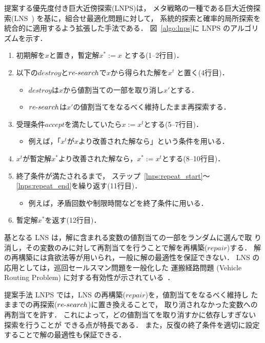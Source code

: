 提案する優先度付き巨大近傍探索(LNPS)は，
メタ戦略の一種である巨大近傍探索(LNS~\cite{Pisinger10})
を基に，組合せ最適化問題に対して，
系統的探索と確率的局所探索を統合的に適用するよう拡張した手法である．
%
図~\ref{algo:lnps}に LNPS のアルゴリズムを示す．
\begin{enumerate}\compress
\item 初期解を$x$と置き，暫定解$x^{*} := x$ とする(1--2行目)．
\item \label{lnps:repeat_start}
  以下の$destroy$と$re\mathchar`-search$で$x$から得られた解を$x^{t}$
  と置く(4行目)．
  \begin{itemize}\compress
  \item $destroy$は$x$から値割当ての一部を取り消し$x'$とする．
  \item $re\mathchar`-search$は$x'$の値割当てをなるべく維持したまま再探索する．
  \end{itemize}
\item 受理条件$accept$を満たしていたら$x := x^{t}$とする(5--7行目)．
  \begin{itemize}\compress
  \item 例えば，「$x^{t}$が$x$より改善された解なら」という条件を用いる．
  \end{itemize}
\item \label{lnps:repeat_end}
  $x^{t}$が暫定解$x^{*}$より改善された解なら，$x^{*} := x^{t}$とする(8--10行目)．
\item 終了条件が満たされるまで，
  ステップ~\ref{lnps:repeat_start}〜\ref{lnps:repeat_end}を繰り返す(11行目)．
  \begin{itemize}\compress
  \item 例えば，矛盾回数や制限時間などを終了条件に用いる．
  \end{itemize}
\item 暫定解$x^{*}$を返す(12行目)．
\end{enumerate}

基となる LNS は，解に含まれる変数の値割当ての一部をランダムに選んで取
り消し，その変数のみに対して再割当てを行うことで解を再構築($repair$)する．
解の再構築には貪欲法等が用いられ，一般に解の最適性を保証できない．
LNS の応用としては，巡回セールスマン問題を一般化した
運搬経路問題 (Vehicle Routing Problem)
に対する有効性が示されている~\cite{Pisinger10}．

提案手法 LNPS では，LNS の再構築($repair$)を，値割当てをなるべく維持し
たままでの再探索($re\mathchar`-search$)に置き換えることで，
取り消されなかった変数への再割当てを許す．
これによって，どの値割当てを取り消すかに依存しすぎない探索を行うことが
できる点が特長である．
また，反復の終了条件を適切に設定することで解の最適性も保証できる．

